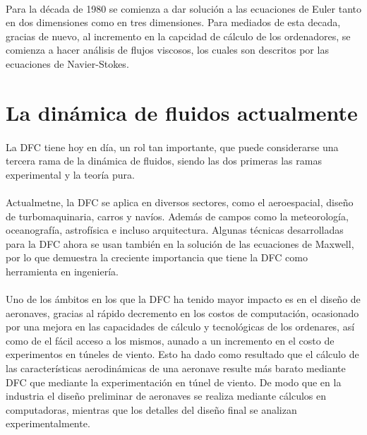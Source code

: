 \documentclass[letterpaper, openright, 12pt]{book}
\begin{document}
				\paragraph*{}
					Para la década de 1980 se comienza a dar solución a las ecuaciones de Euler tanto en dos dimensiones como en tres dimensiones. Para mediados de esta decada, gracias de nuevo, al incremento en la capcidad de cálculo de los ordenadores, se comienza a hacer análisis de flujos viscosos, los cuales son descritos por las ecuaciones de Navier-Stokes.\cite{blazek}
			
		\section{La dinámica de fluidos actualmente}
				\paragraph*{}
					La DFC tiene hoy en día, un rol tan importante, que puede considerarse una tercera rama de la dinámica de fluidos, siendo las dos primeras las ramas experimental y la teoría pura.\cite{anderson-yotros}
					
				\paragraph*{}
					Actualmetne, la DFC se aplica en diversos sectores, como el aeroespacial, diseño de turbomaquinaria, carros y navíos. Además de campos como la meteorología, oceanografía, astrofísica e incluso arquitectura. Algunas técnicas desarrolladas para la DFC ahora se usan también en la solución de las ecuaciones de Maxwell, por lo que demuestra la creciente importancia que tiene la DFC como herramienta en ingeniería.\cite{blazek}
				\paragraph*{}
					Uno de los ámbitos en los que la DFC ha tenido mayor impacto es en el diseño de aeronaves, gracias al rápido decremento en los costos de computación, ocasionado por una mejora en las capacidades de cálculo y tecnológicas de los ordenares, así como de el fácil acceso a los mismos, aunado a un incremento en el costo de experimentos en túneles de viento. Esto ha dado como resultado que el cálculo de las características aerodinámicas de una aeronave resulte más barato mediante DFC que mediante la experimentación en túnel de viento. De modo que en la industria el diseño preliminar de aeronaves se realiza mediante cálculos en computadoras, mientras que los detalles del diseño final se analizan experimentalmente.\cite{anderson-yotros}
\end{document}
